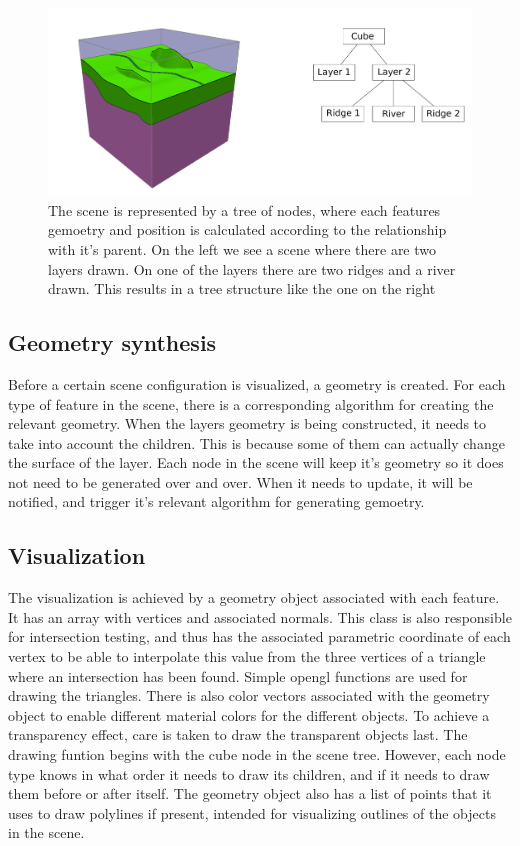 \documentclass[a4paper,12pt]{report}
\begin{document}
\begin{figure}
 \includegraphics[width=\linewidth]{thesis/tree.pdf}
 \caption{The scene is represented by a tree of nodes, where each features gemoetry and position is calculated according to the relationship with it's parent. On the left we see a scene where there are two layers drawn. On one of the layers there are two ridges and a river drawn. This results in a tree structure like the one on the right}
 \label{fig:tree}
\end{figure}


\subsection{Geometry synthesis}
Before a certain scene configuration is visualized, a geometry is created. For each type of feature in the scene, there is a corresponding algorithm for creating the relevant geometry. When the layers geometry is being constructed, it needs to take into account the children. This is because some of them can actually change the surface of the layer. Each node in the scene will keep it's geometry so it does not need to be generated over and over. When it needs to update, it will be notified, and trigger it's relevant algorithm for generating gemoetry.

\subsection{Visualization}
The visualization is achieved by a geometry object associated with each feature. It has an array with vertices and associated normals. This class is also responsible for intersection testing, and thus has the associated parametric coordinate of each vertex to be able to interpolate this value from the three vertices of a triangle where an intersection has been found. Simple opengl functions are used for drawing the triangles. There is also color vectors associated with the geometry object to enable different material colors for the different objects. To achieve a transparency effect, care is taken to draw the transparent objects last. The drawing funtion begins with the cube node in the scene tree. However, each node type knows in what order it needs to draw its children, and if it needs to draw them before or after itself. The geometry object also has a list of points that it uses to draw polylines if present, intended for visualizing outlines of the objects in the scene.
\end{document}
